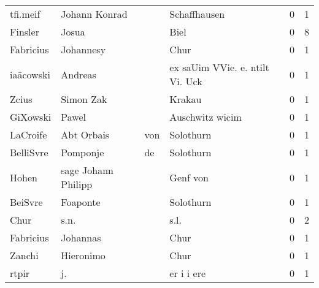 \begin{tabular}{llllrr}
                 tfi.meif &                      Johann Konrad &             &                                Schaffhausen &          0 &         1 \\
                  Finsler &                              Josua &             &                                        Biel &          0 &         8 \\
                Fabricius &                          Johannesy &             &                                        Chur &          0 &         1 \\
                iaäcowski &                            Andreas &             &             ex saUim VVie. e. ntilt Vi. Uck &          0 &         1 \\
                    Zcius &                          Simon Zak &             &                                      Krakau &          0 &         1 \\
                 GiXowski &                              Pawel &             &                             Auschwitz wicim &          0 &         1 \\
                 LaCroife &                        Abt  Orbais &         von &                                   Solothurn &          0 &         1 \\
                BelliSvre &                           Pomponje &          de &                                   Solothurn &          0 &         1 \\
                    Hohen &                sage Johann Philipp &             &                                    Genf von &          0 &         1 \\
                  BeiSvre &                           Foaponte &             &                                   Solothurn &          0 &         1 \\
                     Chur &                               s.n. &             &                                        s.l. &          0 &         2 \\
                Fabricius &                           Johannas &             &                                        Chur &          0 &         1 \\
                   Zanchi &                          Hieronimo &             &                                        Chur &          0 &         1 \\
                    rtpir &                                 j. &             &                                  er i i ere &          0 &         1 \\

\end{tabular}
